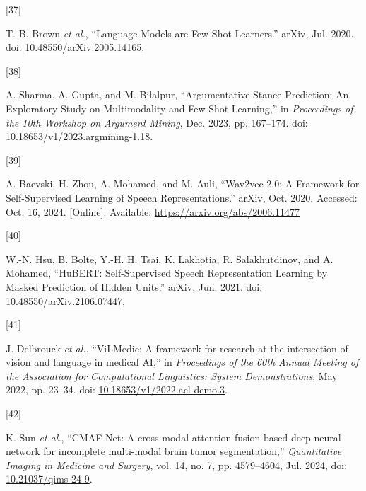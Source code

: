\documentclass[twocolumn,twoside]{article}
\newlength{\cslhangindent}
\newlength{\csllabelwidth}
\newenvironment{CSLReferences}[2] %
 {\begin{list}{}{%
  \setlength{\itemindent}{0pt}
  \setlength{\leftmargin}{0pt}
  \setlength{\parsep}{0pt}
  \ifodd #1
   \setlength{\leftmargin}{\cslhangindent}
   \setlength{\itemindent}{-1\cslhangindent}
  \fi
  \setlength{\itemsep}{#2\baselineskip}}}
 {\end{list}}
\newcommand{\CSLLeftMargin}[1]{\parbox[t]{\csllabelwidth}{\strut#1\strut}}
\newcommand{\CSLRightInline}[1]{\parbox[t]{\linewidth - \csllabelwidth}{\strut#1\strut}}
\begin{document}
\begin{CSLReferences}{0}{0}
\CSLLeftMargin{{[}37{]} }%
\CSLRightInline{T. B. Brown \emph{et al.}, {``Language {Models} are
{Few-Shot Learners}.''} arXiv, Jul. 2020. doi:
\href{https://doi.org/10.48550/arXiv.2005.14165}{10.48550/arXiv.2005.14165}.}

\CSLLeftMargin{{[}38{]} }%
\CSLRightInline{A. Sharma, A. Gupta, and M. Bilalpur, {``Argumentative
{Stance Prediction}: {An Exploratory Study} on {Multimodality} and
{Few-Shot Learning},''} in \emph{Proceedings of the 10th {Workshop} on
{Argument Mining}}, Dec. 2023, pp. 167--174. doi:
\href{https://doi.org/10.18653/v1/2023.argmining-1.18}{10.18653/v1/2023.argmining-1.18}.}

\CSLLeftMargin{{[}39{]} }%
\CSLRightInline{A. Baevski, H. Zhou, A. Mohamed, and M. Auli, {``Wav2vec
2.0: {A Framework} for {Self-Supervised Learning} of {Speech
Representations}.''} arXiv, Oct. 2020. Accessed: Oct. 16, 2024.
{[}Online{]}. Available: \url{https://arxiv.org/abs/2006.11477}}

\CSLLeftMargin{{[}40{]} }%
\CSLRightInline{W.-N. Hsu, B. Bolte, Y.-H. H. Tsai, K. Lakhotia, R.
Salakhutdinov, and A. Mohamed, {``{HuBERT}: {Self-Supervised Speech
Representation Learning} by {Masked Prediction} of {Hidden Units}.''}
arXiv, Jun. 2021. doi:
\href{https://doi.org/10.48550/arXiv.2106.07447}{10.48550/arXiv.2106.07447}.}

\CSLLeftMargin{{[}41{]} }%
\CSLRightInline{J. Delbrouck \emph{et al.}, {``{ViLMedic}: A framework
for research at the intersection of vision and language in medical
{AI},''} in \emph{Proceedings of the 60th {Annual Meeting} of the
{Association} for {Computational Linguistics}: {System Demonstrations}},
May 2022, pp. 23--34. doi:
\href{https://doi.org/10.18653/v1/2022.acl-demo.3}{10.18653/v1/2022.acl-demo.3}.}

\CSLLeftMargin{{[}42{]} }%
\CSLRightInline{K. Sun \emph{et al.}, {``{CMAF-Net}: A cross-modal
attention fusion-based deep neural network for incomplete multi-modal
brain tumor segmentation,''} \emph{Quantitative Imaging in Medicine and
Surgery}, vol. 14, no. 7, pp. 4579--4604, Jul. 2024, doi:
\href{https://doi.org/10.21037/qims-24-9}{10.21037/qims-24-9}.}


\end{CSLReferences}
\end{document}
